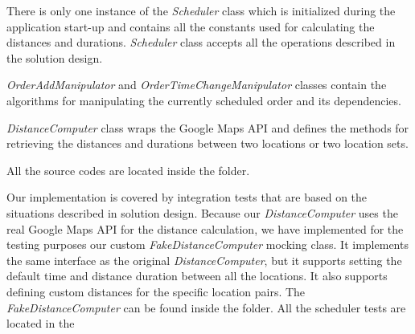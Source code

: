 		There is only one instance of the \textit{Scheduler} class which is initialized during the application start-up and contains all the constants used for calculating the distances and durations. \textit{Scheduler} class accepts all the operations described in the solution design.
		
		\textit{OrderAddManipulator} and \textit{OrderTimeChangeManipulator} classes contain the algorithms for manipulating the currently scheduled order and its dependencies.  
		
		\textit{DistanceComputer} class wraps the Google Maps API and defines the methods for retrieving the distances and durations between two locations or two location sets. 
		
		All the source codes are located inside the  folder. 
		
		Our implementation is covered by integration tests that are based on the situations described in solution design. Because our \textit{DistanceComputer} uses the real Google Maps API for the distance calculation, we have implemented for the testing purposes our custom \textit{FakeDistanceComputer} mocking class. It implements the same interface as the original \textit{DistanceComputer}, but it supports setting the default time and distance duration between all the locations. It also supports defining custom distances for the specific location pairs. The \textit{FakeDistanceComputer} can be found inside the  folder. All the scheduler tests are located in the 
